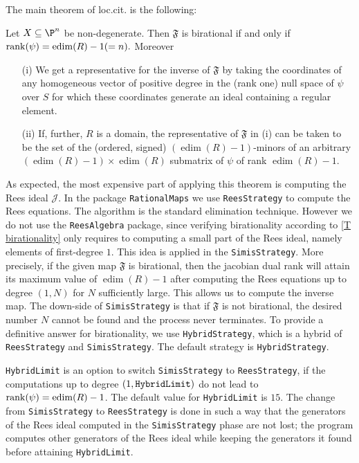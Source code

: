 \documentclass[11pt]{amsart}
\numberwithin{equation}{theorem}
\renewcommand{\:}{\colon}
\DeclareMathOperator{\edim}{edim}
\theoremstyle{theorem}
\begin{document}
The main theorem of loc.cit. is the following:
\begin{theorem} \label{T birationality}Let $X\subseteq \P^n$ be non-degenerate. Then $\mathfrak{F}$ is birational if and only if ${\rm rank}(\psi)=\edim(R)-1(=n).$
Moreover
\begin{enumerate}
  \item[{\rm (i)}] We get a representative for the inverse of $\mathfrak{F}$ by taking the coordinates of any homogeneous vector of positive degree
in the {\rm (}rank one{\rm )} null space of $\psi$ over $S$ for which these coordinates generate an ideal containing
a regular element.

\item[{\rm (ii)}] If, further, $R$ is a domain, the representative of $\mathfrak{F}$ in {\rm (i)}
can be taken to be the set of the {\rm (}ordered, signed{\rm )} $(\edim(R)-1)$-minors
of an arbitrary $(\edim(R)-1)\times \edim(R)$ submatrix of $\psi$ of rank $\edim(R)-1$.
\end{enumerate}

\end{theorem}
As expected, the most expensive part of applying this theorem is computing the Rees ideal ${\mathcal J}$. In the package {\tt RationalMaps} we use {\tt ReesStrategy} to compute the Rees equations. The algorithm is the standard elimination technique. However we do not use the {\tt ReesAlgebra} package, since verifying birationality according to \autoref{T birationality} only requires to computing a small part of the Rees ideal, namely elements of first-degree $1$. This idea is applied in the {\tt SimisStrategy}. More precisely, if the given map $\mathfrak{F}$ is birational, then the jacobian dual rank will attain its maximum value of $\edim(R)-1$ after computing the Rees equations up to  degree $(1,N)$ for $N$ sufficiently large. This allows us to compute the inverse map.  The down-side of {\tt SimisStrategy} is that if $\mathfrak{F}$ is not birational,  the desired number $N$ cannot be found and the process never terminates. To provide a definitive answer for birationality,  we use {\tt HybridStrategy}, which is a hybrid of {\tt ReesStrategy} and {\tt SimisStrategy}.  The default strategy is {\tt HybridStrategy}.

{\tt HybridLimit} is an option to switch   {\tt SimisStrategy} to  {\tt{ReesStrategy}}, if the computations up to degree $(1, \tt{HybridLimit})$ do not lead to   ${\rm rank}(\psi)=\edim(R)-1$.
The default value for {\tt HybridLimit} is $15$. The change from  {\tt SimisStrategy} to  {\tt ReesStrategy} is done in such a way that the generators of the Rees ideal computed in the { \tt SimisStrategy} phase are not lost; the program computes other generators of the Rees ideal while keeping the generators it found before attaining {\tt HybridLimit}.
\end{document}
